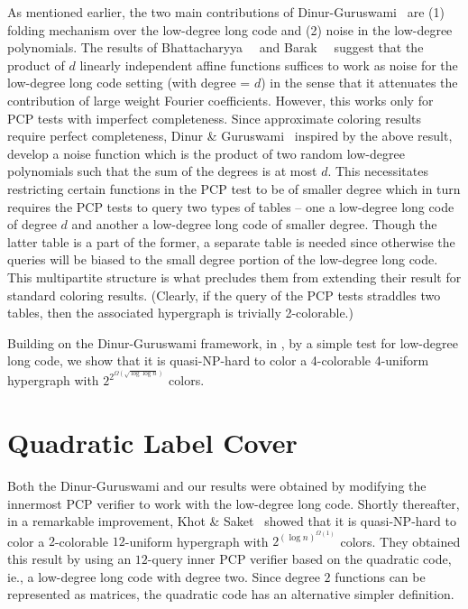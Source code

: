 As mentioned earlier, the two main contributions of Dinur-Guruswami~\cite{DinurG2013}
are (1) folding mechanism over the low-degree long code and (2) noise
in the low-degree polynomials. The results of
Bhattacharyya~\etal~\cite{BhattacharyyaKSSZ2010} and
Barak~\etal~\cite{BarakGHMRS2012} suggest that the product of $d$
linearly independent affine functions suffices to work as noise for
the low-degree long code setting (with degree = $d$) in the sense that
it attenuates the contribution of large weight Fourier
coefficients. However, this works only for PCP tests with imperfect
completeness. Since approximate coloring results require perfect
completeness, Dinur \& Guruswami~\cite{DinurG2013} inspired by the
above result, develop a noise function which is the product of two
random low-degree polynomials such that the sum of the degrees is at
most $d$. This necessitates restricting certain functions in the PCP
test to be of smaller degree which in turn requires the PCP tests to
query two types of tables -- one a low-degree long code of degree $d$
and another a low-degree long code of smaller degree. Though the
latter table is a part of the former, a separate table is needed since
otherwise the queries will be biased to the small degree portion of
the low-degree long code. This multipartite structure is what
precludes them from extending their result for standard coloring
results. (Clearly, if the query of the PCP tests straddles two 
tables, then the associated hypergraph is trivially 2-colorable.)


Building on the
Dinur-Guruswami framework, 
in , by a simple test for
low-degree long code, we
show that it is quasi-NP-hard to color a 4-colorable 4-uniform
hypergraph with $2^{2^{\Omega(\sqrt{\log \log n})}}$ colors.

\section{Quadratic Label Cover}


  Both the
Dinur-Guruswami and our results were obtained by modifying
the innermost PCP verifier to work with the low-degree long
code. Shortly thereafter, in a remarkable improvement,
Khot \& Saket~\cite{KhotS2014b} showed that it is
quasi-NP-hard to color a $2$-colorable $12$-uniform hypergraph with
$2^{(\log n)^{\Omega(1)}}$ colors.  They obtained this result by using
an $12$-query inner PCP verifier based on the quadratic code, ie., a low-degree
long code with degree two. Since degree $2$ functions can be represented
as matrices, the quadratic code has an alternative simpler definition.


